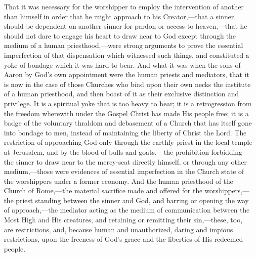 \documentclass[]{book}
\begin{document}
That it was necessary for the worshipper to employ the intervention of another than himself in order that he might approach to his Creator,---that a sinner should be dependent on another sinner for pardon or access to heaven,---that he should not dare to engage his heart to draw near to God except through the medium of a human priesthood,---were strong arguments to prove the essential imperfection of that dispensation which witnessed such things, and constituted a yoke of bondage which it was hard to bear. And what it was when the sons of Aaron by God's own appointment were the human priests and mediators, that it is now in the case of those Churches who bind upon their own necks the institute of a human priesthood, and then boast of it as their exclusive distinction and privilege. It is a spiritual yoke that is too heavy to bear; it is a retrogression from the freedom wherewith under the Gospel Christ has made His people free; it is a badge of the voluntary thraldom and debasement of a Church that has itself gone into bondage to men, instead of maintaining the liberty of Christ the Lord. The restriction of approaching God only through the earthly priest in the local temple at Jerusalem, and by the blood of bulls and goats,---the prohibition forbidding the sinner to draw near to the mercy-seat directly himself, or through any other medium,---those were evidences of essential imperfection in the Church state of the worshippers under a former economy. And the human priesthood of the Church of Rome,---the material sacrifice made and offered for the worshippers,---the priest standing between the sinner and God, and barring or opening the way of approach,---the mediator acting as the medium of communication between the Most High and His creatures, and retaining or remitting their sin,---these, too, are restrictions, and, because human and unauthorized, daring and impious restrictions, upon the freeness of God's grace and the liberties of His redeemed people.
\end{document}
